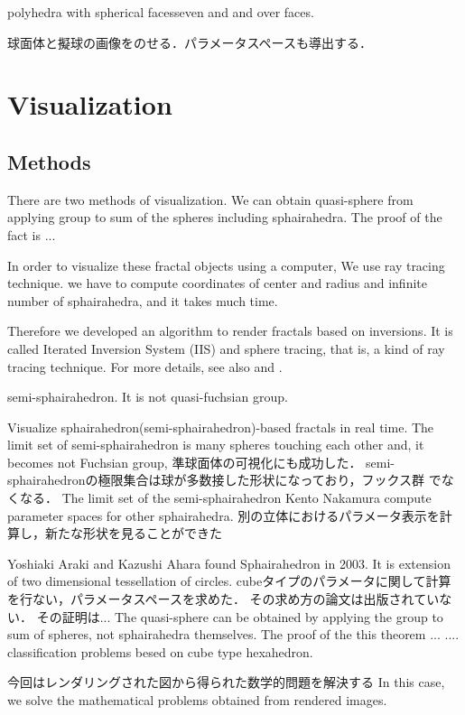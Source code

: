 \documentclass[dvipdfmx]{interact}
\theoremstyle{plain}%
\theoremstyle{definition}
\theoremstyle{remark}
\theoremstyle{problemstyle}
\begin{document}
polyhedra with spherical facesseven and and over faces.

球面体と擬球の画像をのせる．パラメータスペースも導出する．

\section{Visualization}

\subsection{Methods}
There are two methods of visualization. 
We can obtain quasi-sphere from applying group to sum of the spheres
including sphairahedra.
The proof of the fact is ...

In order to visualize these fractal objects using a computer,
We use ray tracing technique.
we have to compute coordinates of center and radius and infinite number
of sphairahedra, and it takes much time.

Therefore we developed an algorithm to render fractals based on
inversions. It is called Iterated Inversion System (IIS) and sphere
tracing, that is, a kind of ray tracing technique.
For more details, see also \cite{bridges2018} and \cite{bridges2017}.

semi-sphairahedron. It is not quasi-fuchsian group.

Visualize sphairahedron(semi-sphairahedron)-based fractals in real time.
The limit set of semi-sphairahedron is many spheres touching each other and,
it becomes not Fuchsian group,
準球面体の可視化にも成功した．
semi-sphairahedronの極限集合は球が多数接した形状になっており，フックス群
でなくなる．
The limit set of the semi-sphairahedron
Kento Nakamura compute parameter spaces for other sphairahedra.
別の立体におけるパラメータ表示を計算し，新たな形状を見ることができた


Yoshiaki Araki and Kazushi Ahara found Sphairahedron in 2003.
It is extension of two dimensional tessellation of circles.
cubeタイプのパラメータに関して計算を行ない，パラメータスペースを求めた．
その求め方の論文は出版されていない．
その証明は...
The quasi-sphere can be obtained by applying the group to sum of
spheres, not sphairahedra themselves.
The proof of the this theorem ... ....
classification problems besed on cube type hexahedron.

今回はレンダリングされた図から得られた数学的問題を解決する
In this case, we solve the mathematical problems obtained from rendered
images.
\end{document}
